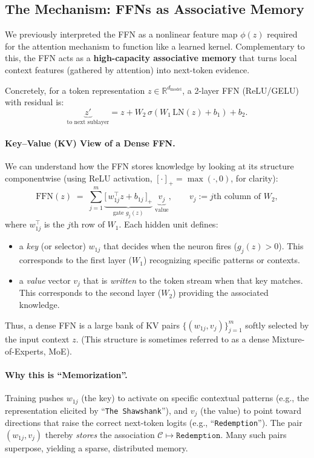 \documentclass{article}
\begin{document}
\subsection{The Mechanism: FFNs as Associative Memory}

We previously interpreted the FFN as a nonlinear feature map $\phi(z)$ required for the attention mechanism to function like a learned kernel. Complementary to this, the FFN acts as a \textbf{high-capacity associative memory} that turns local context features (gathered by attention) into next-token evidence.

Concretely, for a token representation $z\in\mathbb{R}^{d_{\mathrm{model}}}$, a 2-layer FFN (ReLU/GELU) with residual is:
\[
\underbrace{z'}_{\text{to next sublayer}}
= z + W_2\,\sigma(W_1\,\mathrm{LN}(z)+b_1)+b_2.
\]

\paragraph{Key–Value (KV) View of a Dense FFN.}
We can understand how the FFN stores knowledge by looking at its structure componentwise (using ReLU activation, $[\cdot]_+=\max(\cdot,0)$, for clarity):
\[
\mathrm{FFN}(z) \;=\; \sum_{j=1}^{m} \underbrace{\big[\,w_{1j}^{\top} z + b_{1j}\,\big]_+}_{\text{gate } g_j(z)}
\;\underbrace{v_j}_{\text{value}},\qquad
v_j := \text{$j$th column of }W_2,
\]
where $w_{1j}^{\top}$ is the $j$th row of $W_1$. Each hidden unit defines:
\begin{itemize}[leftmargin=1.2em]
\item a \emph{key} (or selector) $w_{1j}$ that decides when the neuron fires ($g_j(z)>0$). This corresponds to the first layer ($W_1$) recognizing specific patterns or contexts.
\item a \emph{value} vector $v_j$ that is \emph{written} to the token stream when that key matches. This corresponds to the second layer ($W_2$) providing the associated knowledge.
\end{itemize}
Thus, a dense FFN is a large bank of KV pairs $\{(w_{1j},v_j)\}_{j=1}^m$ softly selected by the input context $z$. (This structure is sometimes referred to as a dense Mixture-of-Experts, MoE).

\paragraph{Why this is ``Memorization''.}
Training pushes $w_{1j}$ (the key) to activate on specific contextual patterns (e.g., the representation elicited by “\texttt{The Shawshank}”), and $v_j$ (the value) to point toward directions that raise the correct next-token logits (e.g., “\texttt{Redemption}”). The pair \((w_{1j},v_j)\) thereby \emph{stores} the association $\mathcal{C}\mapsto \texttt{Redemption}$. Many such pairs superpose, yielding a sparse, distributed memory.
\end{document}

